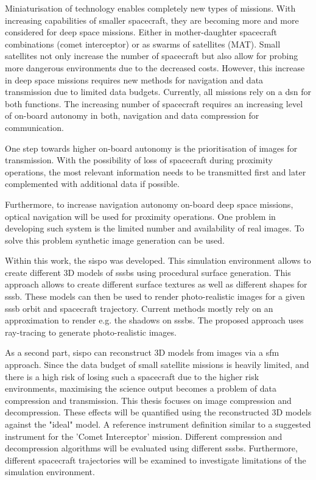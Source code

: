 Miniaturisation of technology enables completely new types of missions. With increasing capabilities of smaller spacecraft, they are becoming more and more considered for deep space missions. Either in mother-daughter spacecraft combinations (comet interceptor) or as swarms of satellites (MAT). Small satellites not only increase the number of spacecraft but also allow for probing more dangerous environments due to the decreased costs. However, this increase in deep space missions requires new methods for navigation and data transmission due to limited data budgets. Currently, all missions rely on a \gls{dsn} for both functions. The increasing number of spacecraft requires an increasing level of on-board autonomy in both, navigation and data compression for communication.

One step towards higher on-board autonomy is the prioritisation of images for transmission. With the  possibility of loss of spacecraft during proximity operations, the most relevant information needs to be transmitted first and later complemented with additional data if possible.

Furthermore, to increase navigation autonomy on-board deep space missions, optical navigation will be used for proximity operations. One problem in developing such system is the limited number and availability of real images. To solve this problem synthetic image generation can be used.

Within this work, the \gls{sispo} was developed. This simulation environment allows to create different 3D models of \gls{sssb}s using procedural surface generation. This approach allows to create different surface textures as well as different shapes for \gls{sssb}. These models can then be used to render photo-realistic images for a given \gls{sssb} orbit and spacecraft trajectory. Current methods mostly rely on an approximation to render e.g. the shadows on \gls{sssb}s. The proposed approach uses ray-tracing to generate photo-realistic images.

As a second part, \gls{sispo} can reconstruct 3D models from images via a \gls{sfm} approach. Since the data budget of small satellite missions is heavily limited, and there is a high risk of losing such a spacecraft due to the higher risk environments, maximising the science output becomes a problem of data compression and transmission. 
This thesis focuses on image compression and decompression. These effects will be quantified using the reconstructed 3D models against the "ideal" model. A reference instrument definition similar to a suggested instrument for the 'Comet Interceptor' mission. Different compression and decompression algorithms will be evaluated using different \gls{sssb}s. Furthermore, different spacecraft trajectories will be examined to investigate limitations of the simulation environment.